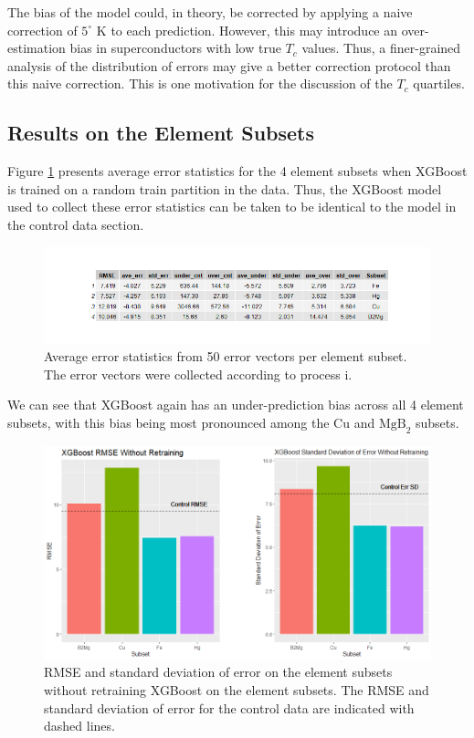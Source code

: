 \documentclass[oneside,12pt]{amsart}
\begin{document}
 The bias of the model could, in theory, be corrected by applying a naive correction of $5^\circ$ K to each prediction. However, this may introduce an over-estimation bias in superconductors with low true $T_c$ values. Thus, a finer-grained analysis of the distribution of errors may give a better correction protocol than this naive correction. This is one motivation for the discussion of the $T_c$ quartiles.
 
 \subsection{Results on the Element Subsets} 
 
 Figure \ref{fig:elemental_ntr_tbl} presents average error statistics for the 4 element subsets when XGBoost is trained on a random train partition in the data. Thus, the XGBoost model used to collect these error statistics can be taken to be identical to the model in the control data section.
 
 \begin{figure}
     \centering
     \includegraphics[width = \linewidth]{Elelmental_nrt_ave_tbl.png}
     \caption{Average error statistics from 50 error vectors per element subset. The error vectors were collected according to process i.}
     \label{fig:elemental_ntr_tbl}
 \end{figure}
 
 We can see that XGBoost again has an under-prediction bias across all 4 element subsets, with this bias being most pronounced among the Cu and $\text{MgB}_2$ subsets. 
 
 \begin{figure}[h]
     \centering
     \includegraphics[width=\linewidth]{Elemental_nrt_bxplt.png}
     \caption{RMSE and standard deviation of error on the element subsets without retraining XGBoost on the element subsets. The RMSE and standard deviation of error for the control data are indicated with dashed lines.}
     \label{fig:elemental_nrt_comparsion}
 \end{figure}
 
\end{document}
